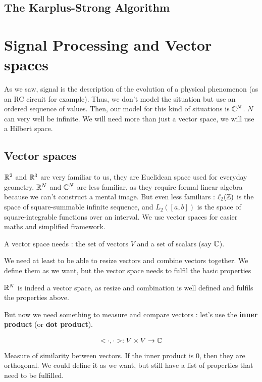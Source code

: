 \documentclass[11pt,a4paper]{article}
\numberwithin{equation}{section}
\begin{document}
\subsection{The Karplus-Strong Algorithm}

\section{Signal Processing and Vector spaces}
As we saw, signal is the description of the evolution of a physical phenomenon (as an RC circuit for example). Thus, we don't model the situation but use an ordered sequence of values. Then, our model for this kind of situations is $\mathbb{C}^N$. $N$ can very well be infinite. We will need more than just a vector space, we will use a Hilbert space.
\subsection{Vector spaces}
$\mathbb{R}^2$ and $\mathbb{R}^3$ are very familiar to us, they are Euclidean space used for everyday geometry. $\mathbb{R}^N$ and $\mathbb{C}^N$ are less familiar, as they require formal linear algebra because we can't construct a mental image. But even less familiars : $\ell_2(\mathbb{Z})$ is the space of square-summable infinite sequence, and $L_2([a,b])$ is the space of square-integrable functions over an interval. We use vector spaces for easier maths and simplified framework.

\begin{definition}
    A vector space needs : the set of vectors $V$ and a set of scalars (say $\mathbb{C}$).
    
    We need at least to be able to resize vectors and combine vectors together. We define them as we want, but the vector space needs to fulfil the basic properties
\end{definition}
\begin{example}
    $\mathbb{R}^N$ is indeed a vector space, as resize and combination is well defined and fulfils the properties above.
\end{example}
But now we need something to measure and compare vectors : let's use the \textbf{inner product} (or \textbf{dot product}).

\begin{definition}
    \begin{equation}
        <\cdot,\cdot> : V \times V \to \mathbb{C}
    \end{equation}
    Measure of similarity between vectors. If the inner product is 0, then they are orthogonal. We could define it as we want, but still have a list of properties that need to be fulfilled. 
\end{definition}
\end{document}
